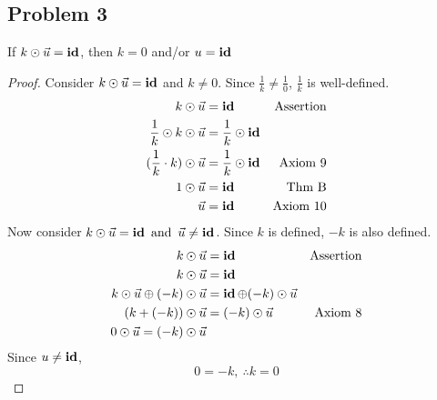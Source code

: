 \subsection*{Problem 3}
 If $k \odot \vec{u} = \operatorname{\textbf{id}}$, then $k=0$ and/or $u = \operatorname{\textbf{id}}$
\begin{proof}
  Consider $k \odot \vec{u} = \operatorname{\textbf{id}}$ and $k \neq 0 $. Since $\frac{1}{k} \neq \frac{1}{0}$, $\frac{1}{k}$ is well-defined.
  \begin{align*}
    k \odot \vec{u}                     & = \operatorname{\textbf{id}}                   & \text{Assertion} \\
    \frac{1}{k} \odot k \odot \vec{u}   & = \frac{1}{k} \odot \operatorname{\textbf{id}}                    \\
    (\frac{1}{k} \cdot k) \odot \vec{u} & = \frac{1}{k} \odot \operatorname{\textbf{id}} & \text{Axiom 9}   \\
    1 \odot \vec{u}                     & = \operatorname{\textbf{id}}                   & \text{Thm B}     \\
    \vec{u}                             & = \operatorname{\textbf{id}}                   & \text{Axiom 10}
  \end{align*}
  Now consider $k \odot \vec{u} = \operatorname{\textbf{id}} \operatorname{~\text{and}~} \vec{u} \neq \operatorname{\textbf{id}}$. Since $k$ is defined, $-k$ is also defined.
  \begin{align*}
    k \odot \vec{u}                           & = \operatorname{\textbf{id}}                           & \text{Assertion} \\
    k \odot \vec{u}                           & = \operatorname{\textbf{id}}                                              \\
    k \odot \vec{u} \oplus (-k) \odot \vec{u} & = \operatorname{\textbf{id}} \oplus (-k) \odot \vec{u}                    \\
    (k+ (-k)) \odot \vec{u}                   & = (-k) \odot \vec{u}                 & \text{Axiom 8}   \\
    0 \odot \vec{u} = (-k) \odot \vec{u}
  \end{align*}
  Since $u \neq \operatorname{\textbf{id}}$,
  \[
    0 = -k,~\therefore k = 0
  \]
\end{proof}

